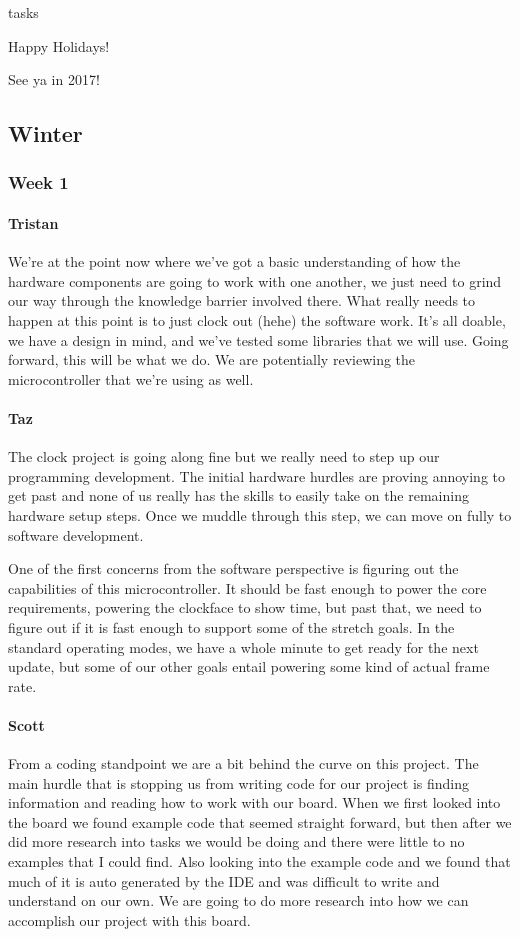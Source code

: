 tasks\documentclass[onecolumn, draftclsnofoot,10pt, compsoc]{IEEEtran}
\begin{document}
Happy Holidays!

See ya in 2017!
\subsection{Winter}
\subsubsection{Week 1}
\paragraph{Tristan}
We're at the point now where we've got a basic understanding of how the hardware components are going to work with one another, we just need to grind our way through the knowledge barrier involved there. What really needs to happen at this point is to just clock out (hehe) the software work. It's all doable, we have a design in mind, and we've tested some libraries that we will use. Going forward, this will be what we do. We are potentially reviewing the microcontroller that we're using as well.

\paragraph{Taz}
The clock project is going along fine but we really need to step up our programming development. The initial hardware hurdles are proving annoying to get past and none of us really has the skills to easily take on the remaining hardware setup steps. Once we muddle through this step, we can move on fully to software development.

One of the first concerns from the software perspective is figuring out the capabilities of this microcontroller. It should be fast enough to power the core requirements, powering the clockface to show time, but past that, we need to figure out if it is fast enough to support some of the stretch goals. In the standard operating modes, we have a whole minute to get ready for the next update, but some of our other goals entail powering some kind of actual frame rate.
\paragraph{Scott}
From a coding standpoint we are a bit behind the curve on this project. The main hurdle that is stopping us from writing code for our project is finding information and reading how to work with our board. When we first looked into the board we found example code that seemed straight forward, but then after we did more research into tasks we would be doing and there were little to no examples that I could find. Also looking into the example code and we found that much of it is auto generated by the IDE and was difficult to write and understand on our own. We are going to do more research into how we can accomplish our project with this board.
\end{document}
